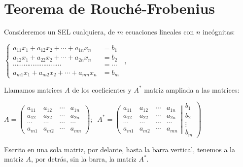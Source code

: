 
\section{Teorema de Rouché-Frobenius}


Consideremos un SEL cualquiera, de $m$ ecuaciones lineales con $n$ incógnitas:

\centerline {$\begin{cases} a_{11}x_1+a_{12}x_2 + \cdots + a_{1n}x_n &=b_1 \\
a_{12}x_1+a_{22}x_2 + \cdots + a_{2n}x_n &=b_2 \\
\cdots  \cdots  \cdots  \cdots  \cdots  \cdots \cdots  \cdots  \cdots  &= \cdots \\
a_{m1}x_1+a_{m2}x_2+\cdots +a_{mn}x_n &=b_m  \end{cases} $	,}

\justify
Llamamos matrices $A$ de los coeficientes y $A^*$ matriz ampliada a las matrices:



$A=\left( \begin{matrix}  a_{11}&a_{12}& \cdots &a_{1n} \\
a_{12} &a_{22} &\cdots &a_{2n} \\
\cdots & \cdots & \cdots & \cdots  \\
a_{m1} &a_{m2} &\cdots &a_{mn}    \end{matrix} \right); \; \; A^*=
\left( \begin{matrix}  a_{11}&a_{12}& \cdots &a_{1n} \\
a_{12} &a_{22} &\cdots &a_{2n} \\
\cdots & \cdots & \cdots & \cdots  \\
a_{m1} &a_{m2} &\cdots &a_{mn}    \end{matrix} \right|
\left. \begin{matrix} b_1\\b_2\\ \vdots \\ b_m \end{matrix} \right)$

Escrito en una sola matriz, por delante, hasta la barra vertical, tenemos a la matriz $A$, por detrás, sin la barra, la matriz $A^*$.


